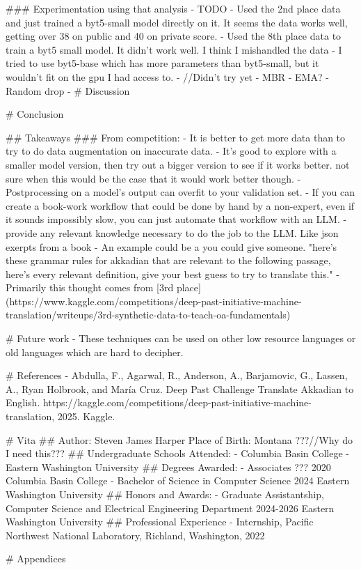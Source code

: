### Experimentation using that analysis
- TODO
- Used the 2nd place data and just trained a byt5-small model directly on it. It seems the data works well, getting over 38 on public and 40 on private score.
- Used the 8th place data to train a byt5 small model. It didn't work well. I think I mishandled the data
- I tried to use byt5-base which has more parameters than byt5-small, but it wouldn't fit on the gpu I had access to.
- //Didn't try yet
    - MBR
    - EMA?
    - Random drop
    - 
# Discussion

# Conclusion 

## Takeaways
### From competition:  
- It is better to get more data than to try to do data augmentation on inaccurate data.
- It's good to explore with a smaller model version, then try out a bigger version to see if it works better. not sure when this would be the case that it would work better though.
- Postprocessing on a model's output can overfit to your validation set.
- If you can create a book-work workflow that could be done by hand by a non-expert, even if it sounds impossibly slow, you can just automate that workflow with an LLM. 
    - provide any relevant knowledge necessary to do the job to the LLM. Like json exerpts from a book
    - An example could be a you could give someone. "here's these grammar rules for akkadian that are relevant to the following passage, here's every relevant definition,  give your best guess to try to translate this."
    - Primarily this thought comes from [3rd place](https://www.kaggle.com/competitions/deep-past-initiative-machine-translation/writeups/3rd-synthetic-data-to-teach-oa-fundamentals) 

# Future work
- These techniques can be used on other low resource languages or old languages which are hard to decipher.


# References
- Abdulla, F., Agarwal, R., Anderson, A., Barjamovic, G., Lassen, A., Ryan Holbrook, and María Cruz. Deep Past Challenge Translate Akkadian to English. https://kaggle.com/competitions/deep-past-initiative-machine-translation, 2025. Kaggle.

# Vita
## Author: Steven James Harper
Place of Birth: Montana ???//Why do I need this???
## Undergraduate Schools Attended: 
- Columbia Basin College
- Eastern Washington University
## Degrees Awarded: 
- Associates ??? 2020 Columbia Basin College
- Bachelor of Science in Computer Science 2024 Eastern Washington University
## Honors and Awards: 
- Graduate Assistantship, Computer Science and Electrical Engineering Department 2024-2026 Eastern Washington University
## Professional Experience
- Internship, Pacific Northwest National Laboratory, Richland, Washington, 2022

# Appendices
 